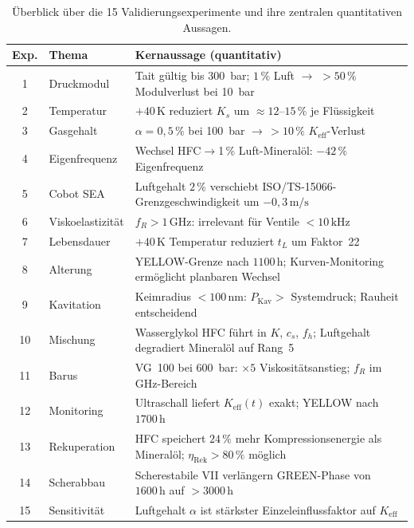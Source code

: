﻿\documentclass[a4paper,12pt]{scrreprt}
\theoremstyle{definition}
\begin{document}
\begin{table}[H]
  \centering
  \caption{Überblick über die 15 Validierungsexperimente und ihre
           zentralen quantitativen Aussagen.}
  \label{tab:exp_summary}
  \small
  \begin{tabularx}{\textwidth}{c l X}
    \toprule
    \textbf{Exp.} & \textbf{Thema} & \textbf{Kernaussage (quantitativ)} \\
    \midrule
    1  & Druckmodul & Tait gültig bis 300~bar; $1\,\%$ Luft $\to$ $>50\,\%$ Modulverlust bei 10~bar \\
    2  & Temperatur & $+40\,\mathrm{K}$ reduziert $K_s$ um $\approx 12$--$15\,\%$ je Flüssigkeit \\
    3  & Gasgehalt  & $\alpha = 0{,}5\,\%$ bei 100~bar $\to\,{>}10\,\%$ $K_{\mathrm{eff}}$-Verlust \\
    4  & Eigenfrequenz & Wechsel HFC$\to$1\,\% Luft-Mineralöl: $-42\,\%$ Eigenfrequenz \\
    5  & Cobot SEA & Luftgehalt $2\,\%$ verschiebt ISO/TS-15066-Grenzgeschwindigkeit um $-0{,}3\,\mathrm{m/s}$ \\
    6  & Viskoelastizität & $f_R > 1\,\mathrm{GHz}$: irrelevant für Ventile $<10\,\mathrm{kHz}$ \\
    7  & Lebensdauer & $+40\,\mathrm{K}$ Temperatur reduziert $t_L$ um Faktor~22 \\
    8  & Alterung & YELLOW-Grenze nach $1100\,\mathrm{h}$; Kurven-Monitoring ermöglicht planbaren Wechsel \\
    9  & Kavitation & Keimradius $< 100\,\mathrm{nm}$: $P_{\mathrm{Kav}} >$ Systemdruck; Rauheit entscheidend \\
   10  & Mischung & Wasserglykol HFC führt in $K$, $c_s$, $f_h$; Luftgehalt degradiert Mineralöl auf Rang~5 \\
   11  & Barus & VG~100 bei 600~bar: $\times 5$ Viskositätsanstieg; $f_R$ im GHz-Bereich \\
   12  & Monitoring & Ultraschall liefert $K_{\mathrm{eff}}(t)$ exakt; YELLOW nach $1700\,\mathrm{h}$ \\
   13  & Rekuperation & HFC speichert $24\,\%$ mehr Kompressionsenergie als Mineralöl; $\eta_{\mathrm{Rek}} > 80\,\%$ möglich \\
   14  & Scherabbau & Scherestabile VII verlängern GREEN-Phase von $1600\,\mathrm{h}$ auf $> 3000\,\mathrm{h}$ \\
   15  & Sensitivität & Luftgehalt $\alpha$ ist stärkster Einzeleinflussfaktor auf $K_{\mathrm{eff}}$ \\
    \bottomrule
  \end{tabularx}
\end{table}
\end{document}
